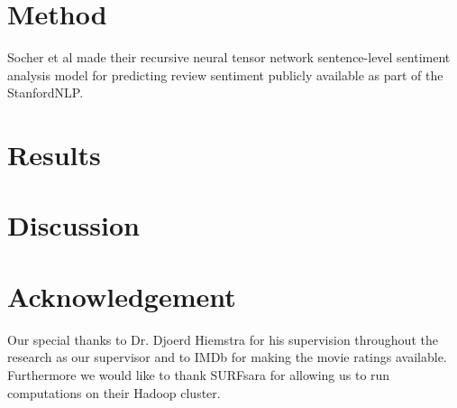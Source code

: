 \documentclass{sig-alternate-br}
\begin{document}
\section{Method}
Socher et al \cite{Socher2013} made their recursive neural tensor network sentence-level sentiment analysis model for predicting review sentiment publicly available as part of the StanfordNLP.

\section{Results}

\section{Discussion}

\section{Acknowledgement}
Our special thanks to Dr. Djoerd Hiemstra for his supervision throughout the research as our supervisor and to IMDb for making the movie ratings available. Furthermore we would like to thank SURFsara for allowing us to run computations on their Hadoop cluster.
%




\balancecolumns

\onecolumn
\end{document}
